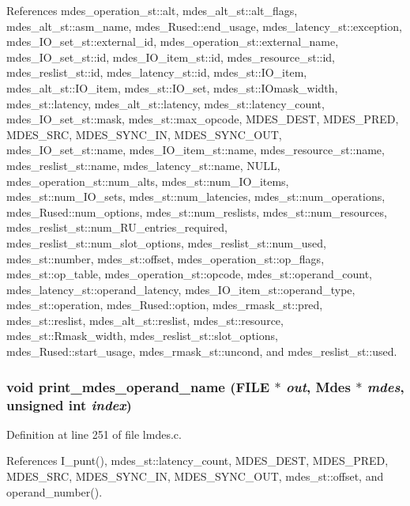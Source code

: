 References mdes\_\-operation\_\-st::alt, mdes\_\-alt\_\-st::alt\_\-flags, mdes\_\-alt\_\-st::asm\_\-name, mdes\_\-Rused::end\_\-usage, mdes\_\-latency\_\-st::exception, mdes\_\-IO\_\-set\_\-st::external\_\-id, mdes\_\-operation\_\-st::external\_\-name, mdes\_\-IO\_\-set\_\-st::id, mdes\_\-IO\_\-item\_\-st::id, mdes\_\-resource\_\-st::id, mdes\_\-reslist\_\-st::id, mdes\_\-latency\_\-st::id, mdes\_\-st::IO\_\-item, mdes\_\-alt\_\-st::IO\_\-item, mdes\_\-st::IO\_\-set, mdes\_\-st::IOmask\_\-width, mdes\_\-st::latency, mdes\_\-alt\_\-st::latency, mdes\_\-st::latency\_\-count, mdes\_\-IO\_\-set\_\-st::mask, mdes\_\-st::max\_\-opcode, MDES\_\-DEST, MDES\_\-PRED, MDES\_\-SRC, MDES\_\-SYNC\_\-IN, MDES\_\-SYNC\_\-OUT, mdes\_\-IO\_\-set\_\-st::name, mdes\_\-IO\_\-item\_\-st::name, mdes\_\-resource\_\-st::name, mdes\_\-reslist\_\-st::name, mdes\_\-latency\_\-st::name, NULL, mdes\_\-operation\_\-st::num\_\-alts, mdes\_\-st::num\_\-IO\_\-items, mdes\_\-st::num\_\-IO\_\-sets, mdes\_\-st::num\_\-latencies, mdes\_\-st::num\_\-operations, mdes\_\-Rused::num\_\-options, mdes\_\-st::num\_\-reslists, mdes\_\-st::num\_\-resources, mdes\_\-reslist\_\-st::num\_\-RU\_\-entries\_\-required, mdes\_\-reslist\_\-st::num\_\-slot\_\-options, mdes\_\-reslist\_\-st::num\_\-used, mdes\_\-st::number, mdes\_\-st::offset, mdes\_\-operation\_\-st::op\_\-flags, mdes\_\-st::op\_\-table, mdes\_\-operation\_\-st::opcode, mdes\_\-st::operand\_\-count, mdes\_\-latency\_\-st::operand\_\-latency, mdes\_\-IO\_\-item\_\-st::operand\_\-type, mdes\_\-st::operation, mdes\_\-Rused::option, mdes\_\-rmask\_\-st::pred, mdes\_\-st::reslist, mdes\_\-alt\_\-st::reslist, mdes\_\-st::resource, mdes\_\-st::Rmask\_\-width, mdes\_\-reslist\_\-st::slot\_\-options, mdes\_\-Rused::start\_\-usage, mdes\_\-rmask\_\-st::uncond, and mdes\_\-reslist\_\-st::used.
\subsubsection{\setlength{\rightskip}{0pt plus 5cm}void print\_\-mdes\_\-operand\_\-name (FILE $\ast$ {\em out}, \bf{Mdes} $\ast$ {\em mdes}, unsigned int {\em index})}\label{lmdes_8c_9f72ff9b38d5ff16f0f12fc4a82d7cac}




Definition at line 251 of file lmdes.c.

References I\_\-punt(), mdes\_\-st::latency\_\-count, MDES\_\-DEST, MDES\_\-PRED, MDES\_\-SRC, MDES\_\-SYNC\_\-IN, MDES\_\-SYNC\_\-OUT, mdes\_\-st::offset, and operand\_\-number().

